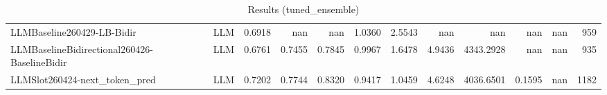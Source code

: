 \begin{table}[htbp]
{\begin{tabular}{ll|rrrrrrrrr|r}
LLMBaseline260429-LB-Bidir & LLM & 0.6918 & nan & nan & 1.0360 & 2.5543 & nan & nan & nan & nan & 959 \\
LLMBaselineBidirectional260426-BaselineBidir & LLM & 0.6761 & 0.7455 & 0.7845 & 0.9967 & 1.6478 & 4.9436 & 4343.2928 & nan & nan & 935 \\
LLMSlot260424-next\_token\_pred & LLM & 0.7202 & 0.7744 & 0.8320 & 0.9417 & 1.0459 & 4.6248 & 4036.6501 & 0.1595 & nan & 1182 \\
\bottomrule
\end{tabular}
}
\caption{Results (tuned_ensemble)}
\label{tab:results_tuned_ensemble}
\end{table}